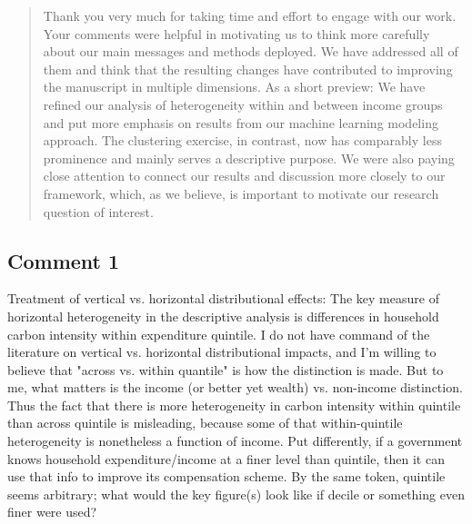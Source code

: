 \documentclass[11pt]{article}
\newenvironment{response}
{\begin{quote}\color{black}}
{\end{quote}}
\begin{document}
\begin{response}
    Thank you very much for taking time and effort to engage with our work. Your comments were helpful in motivating us to think more carefully about our main messages and methods deployed. We have addressed all of them and think that the resulting changes have contributed to improving the manuscript in multiple dimensions. As a short preview: We have refined our analysis of heterogeneity within and between income groups and put more emphasis on results from our machine learning modeling approach. The clustering exercise, in contrast, now has comparably less prominence and mainly serves a descriptive purpose. We were also paying close attention to connect our results and discussion more closely to our framework, which, as we believe, is important to motivate our research question of interest. 
\end{response}
    
\subsection*{Comment 1}\label{comment_R1_1}

\begin{commentbox}
    Treatment of vertical vs. horizontal distributional effects: The key measure of horizontal heterogeneity in the descriptive analysis is differences in household carbon intensity within expenditure quintile. I do not have command of the literature on vertical vs. horizontal distributional impacts, and I'm willing to believe that "across vs. within quantile" is how the distinction is made. But to me, what matters is the income (or better yet wealth) vs. non-income distinction. Thus the fact that there is more heterogeneity in carbon intensity within quintile than across quintile is misleading, because some of that within-quintile heterogeneity is nonetheless a function of income. Put differently, if a government knows household expenditure/income at a finer level than quintile, then it can use that info to improve its compensation scheme. By the same token, quintile seems arbitrary; what would the key figure(s) look like if decile or something even finer were used?
\end{commentbox}
\end{document}
